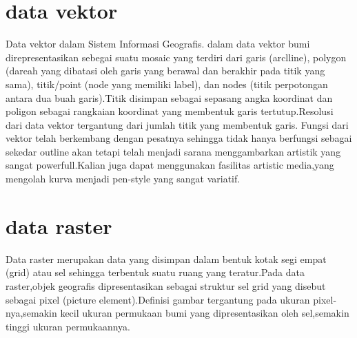 


\section{data vektor}
  Data vektor dalam Sistem Informasi Geografis. dalam  data vektor bumi direpresentasikan sebegai suatu  mosaic yang terdiri dari garis (arclline), polygon (dareah yang dibatasi oleh garis yang berawal dan berakhir pada titik yang sama), titik/point (node yang memiliki label),  dan nodes (titik perpotongan antara dua buah garis).Titik disimpan sebagai sepasang angka koordinat dan poligon sebagai rangkaian koordinat yang membentuk garis tertutup.Resolusi dari data vektor tergantung dari jumlah titik yang membentuk garis.
  Fungsi dari vektor telah berkembang dengan pesatnya sehingga tidak hanya berfungsi sebagai sekedar outline akan tetapi telah menjadi sarana menggambarkan artistik yang sangat powerfull.Kalian juga dapat menggunakan fasilitas artistic media,yang mengolah kurva menjadi pen-style yang sangat variatif.

  
 \section{data raster}
 Data raster merupakan data yang disimpan dalam bentuk kotak segi empat (grid)
atau sel sehingga terbentuk suatu ruang yang teratur.Pada data raster,objek geografis dipresentasikan sebagai struktur sel grid yang disebut sebagai pixel (picture element).Definisi gambar tergantung pada ukuran pixel-nya,semakin kecil ukuran permukaan bumi yang dipresentasikan oleh sel,semakin tinggi ukuran permukaannya.


